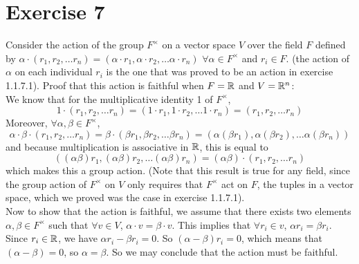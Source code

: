 \documentclass{article}
\begin{document}
    \section*{Exercise 7}
    Consider the action of the group $F^\times$ on a vector space $V$
    over the field $F$ defined by $\alpha \cdot (r_1, r_2, \dots r_n)
    = (\alpha \cdot r_1, \alpha \cdot r_2, \dots \alpha \cdot r_n)$
    $\forall \alpha \in F^\times$ and $r_i \in F$.
    (the action of $\alpha$ on each individual $r_i$ is the one that
    was proved to be an action in exercise 1.1.7.1).
    Proof that this action is faithful when $F = \mathbb{R}$ and $V = \mathbb{R}^n$: \\
    We know that for the multiplicative identity 1 of $F^\times$,
    \[ 1 \cdot (r_1, r_2, \dots r_n) =
    (1 \cdot r_1, 1 \cdot r_2, \dots 1 \cdot r_n)
    = (r_1, r_2, \dots r_n) \]
    Moreover, $\forall \alpha, \beta \in F^\times$,
    \[ \alpha \cdot \beta \cdot (r_1, r_2, \dots r_n)
    = \beta \cdot (\beta r_1, \beta r_2, \dots \beta r_n)
    = (\alpha (\beta r_1), \alpha (\beta r_2),
    \dots \alpha (\beta r_n)) \]
    and because multiplication is associative in $\mathbb{R}$, this is equal to
    \[((\alpha \beta) r_1, (\alpha \beta) r_2,
    \dots (\alpha \beta) r_n)
     = (\alpha \beta) \cdot (r_1, r_2, \dots r_n) \]
    which makes this a group action.
    (Note that this result is true for any field,
    since the group action of $F^\times$ on $V$ only requires that
    $F^\times$ act on $F$, the tuples in a vector space,
    which we proved was the case in exercise 1.1.7.1). \\
    Now to show that the action is faithful,
    we assume that there exists two elements $\alpha, \beta \in F^\times$
    such that $\forall v \in V$, $\alpha \cdot v = \beta \cdot v$.
    This implies that $\forall r_i \in v$,
    $\alpha r_i = \beta r_i$.
    Since $r_i \in \mathbb{R}$,
    we have $\alpha r_i - \beta r_i = 0$.
    So $(\alpha - \beta) r_i = 0$,
    which means that $(\alpha - \beta) = 0$,
    so $\alpha = \beta$.
    So we may conclude that the action must be faithful.
\end{document}
